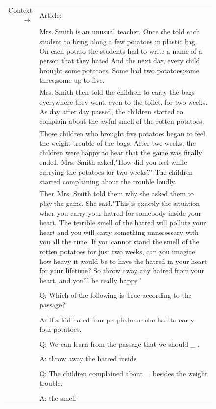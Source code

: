 \begin{figure} { \tt \footnotesize \begin{tabularx}{\linewidth}{r X} \toprule Context $\to$ & Article: \\ 
 & Mrs. Smith is an unusual teacher. Once she told each student to bring along a few potatoes in plastic bag. On each potato the students had to write a name of a person that they hated And the next day, every child brought some potatoes. Some had two potatoes;some three;some up to five. \\ 
 & Mrs. Smith then told the children to carry the bags everywhere they went, even to the toilet, for two weeks. As day after day passed, the children started to complain about the awful smell of the rotten potatoes. \\ 
 & Those children who brought five potatoes began to feel the weight trouble of the bags. After two weeks, the children were happy to hear that the game was finally ended. Mrs. Smith asked,"How did you feel while carrying the potatoes for two weeks?" The children started complaining about the trouble loudly. \\ 
 & Then Mrs. Smith told them why she asked them to play the game. She said,"This is exactly the situation when you carry your hatred for somebody inside your heart. The terrible smell of the hatred will pollute your heart and you will carry something unnecessary with you all the time. If you cannot stand the smell of the rotten potatoes for just two weeks, can you imagine how heavy it would be to have the hatred in your heart for your lifetime? So throw away any hatred from your heart, and you'll be really happy." \\ 
 &  \\ 
 & Q: Which of the following is True according to the passage? \\ 
 &  \\ 
 & A: If a kid hated four people,he or she had to carry four potatoes. \\ 
 &  \\ 
 & Q: We can learn from the passage that we should  \_  . \\ 
 &  \\ 
 & A: throw away the hatred inside \\ 
 &  \\ 
 & Q: The children complained about  \_  besides the weight trouble. \\ 
 &  \\ 
 & A: the smell \\ 

\end{tabularx}}
\end{figure}
